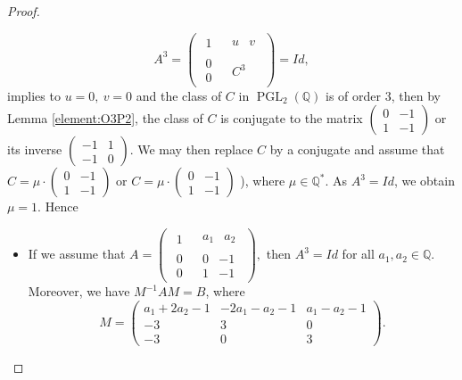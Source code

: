 \documentclass[10pt,a4paper]{amsart}
\DeclareMathOperator{\PGL}{PGL}
\newcommand{\Q}{\ensuremath{\mathbb{Q} }}
\begin{document}
\begin{proof}
\begin{itemize}
\[A^3=\left(
  \begin{array}{ccc}
\begin{matrix}
    1
\end{matrix}
&
\begin{matrix}
    u & v
\end{matrix}\\
\begin{matrix}
    0\\0
\end{matrix}&
\begin{matrix}
    C^3
\end{matrix}
\end{array}
\right)=Id,
\]
implies to $u=0,~v=0$ and the class of $C$ in $\PGL _2(\Q )$ is of order $3$, then by Lemma \ref{element:O3P2}, the class of $C$ is conjugate to the matrix $\left(\begin{matrix}
       0&-1\\1&-1 
    \end{matrix}\right)$ or its inverse $\left(\begin{array}{cc}
-1 & 1 
\\
 -1 & 0 
\end{array}\right)$. We may then replace $C$ by a conjugate and assume that $C= \mu\cdot\left(\begin{matrix}
       0&-1\\1&-1 
    \end{matrix}\right)$ or $C=\mu\cdot\left(\begin{matrix}
       0&-1\\1&-1 
    \end{matrix}\right)$ ), where $\mu\in\Q^*$. As $A^3=Id$, we obtain $\mu=1$. Hence 
    
    \begin{itemize}
        \item [(b.1.1)] If we assume that
$A=\left(
  \begin{array}{ccc}
\begin{matrix}
    1
\end{matrix}
&
\begin{matrix}
    a_{1} & a_{2}
\end{matrix}\\
\begin{matrix}
    0\\0
\end{matrix}&
\begin{matrix}
    0&-1\\1&-1
\end{matrix}
\end{array}
\right),
$ then $A^3=Id$ for all $a_{1},a_{2}\in\Q $. Moreover, we have $M^{-1}AM=B$, where 
\[M=\left(\begin{array}{ccc}
a_{1}+2 a_{2}-1 & -2 a_{1}-a_{2}-1 & a_{1}-a_{2}-1 
\\
 -3 & 3 & 0 
\\
 -3 & 0 & 3 
\end{array}
\right).\]
 

\end{itemize}
\end{itemize}
\end{proof}
\end{document}
